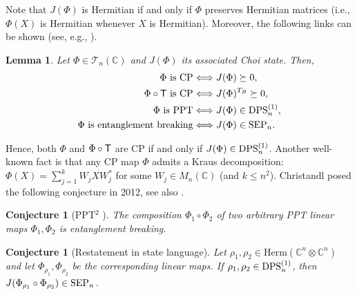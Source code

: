 \documentclass[11pt]{article}
\newcommand{\C}{\ensuremath{\mathbb{C}}} %
\newcommand{\Herm}{\mathrm{Herm}}
\newcommand{\SEP}{\text{\rm SEP}}
\newcommand{\DPS}{\text{\rm DPS}}
\newcommand{\ot}{\otimes}
\theoremstyle{plain}
\newtheorem{lemma}[satz]{Lemma}
\newtheorem{remark}[satz]{Remark}
\newtheorem{conjecture}[satz]{Conjecture}
\begin{document}
\noindent
Note that $J(\Phi)$ is Hermitian if and only if $\Phi$ preserves Hermitian matrices (i.e., $\Phi(X)$ is Hermitian whenever $X$ is Hermitian).  Moreover, the following links can be shown (see, e.g., \cite{SN-CLDUI, Singh-Nechita-PPT2}).

\begin{lemma}\label{lem:Phi-Choi}
    Let $\Phi\in\mathcal{T}_n(\C)$ and $J(\Phi)$ its associated Choi state. Then, 
     \begin{align*}
     \Phi \text{ is CP} & \Longleftrightarrow J(\Phi)\succeq 0,\\
     \Phi\circ \sf T \text{ is CP} &\Longleftrightarrow J(\Phi)^{T_B}\succeq 0,\\
        \Phi \text{ is PPT} &\Longleftrightarrow J(\Phi)\in\DPS^{(1)}_n,\\
        \Phi \text{ is entanglement breaking} &\Longleftrightarrow J(\Phi)\in\SEP_n.
    \end{align*}
\end{lemma}

\noindent
Hence, both $\Phi$ and $\Phi\circ \sf T$ are CP if and only if $J(\Phi)\in \DPS^{(1)}_n$. Another well-known fact is that any CP map $\Phi$ admits a Kraus decomposition: $\Phi(X)=\sum_{j =1}^k W_j X W_j^*$ for some $W_j\in M_n(\C)$ (and $k\le n^2$). Christandl posed the following conjecture in 2012, see also \cite{CMHW-2018}.

\begin{conjecture}[PPT$^2$ ]\label{conj:PPT2}
    The composition $\Phi_1\circ \Phi_2$ of two arbitrary PPT linear maps $\Phi_1,\Phi_2$  is entanglement breaking.
\end{conjecture}

\begin{conjecture}[Restatement in state language]\label{conj:PPT2-states}
    Let $\rho_1,\rho_2 \in\Herm(\C^n\ot \C^n)$ and let $\Phi_{\rho_1},\Phi_{\rho_2}$ be the corresponding linear maps. If $\rho_1,\rho_2\in \DPS^{(1)}_n$, then   $J(\Phi_{\rho_1}\circ\Phi_{\rho_2})\in\SEP_n$.
\end{conjecture}

\end{document}
